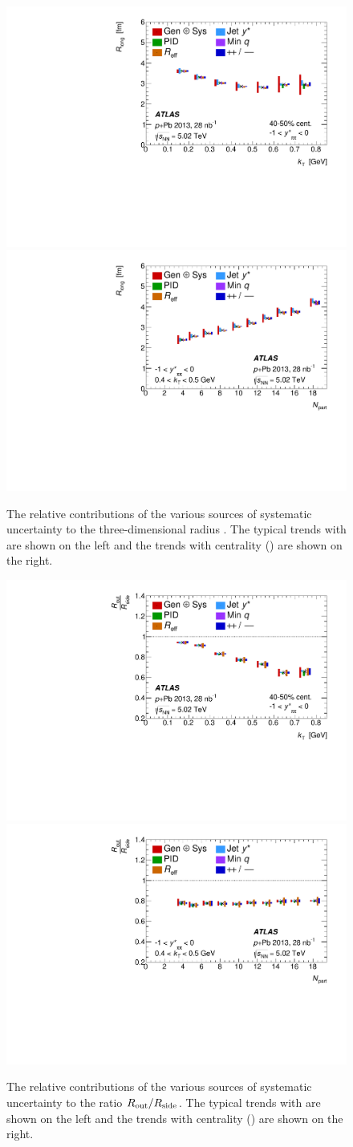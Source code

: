 \begin{figure}[t]
\centering
\includegraphics[width=0.49\linewidth]{canqosl_Rlong_vs_kt_systs.pdf}
\includegraphics[width=0.49\linewidth]{canqosl_Rlong_vs_npart_systs.pdf}\\
\caption{The relative contributions of the various sources of systematic uncertainty to the three-dimensional radius \Rlong. The typical trends with \kt are shown on the left and the trends with centrality (\Npart) are shown on the right.}
\label{fig:syst_rlong}
\end{figure}

\begin{figure}[t]
\centering
\includegraphics[width=0.49\linewidth]{canqosl_RoutOverRside_vs_kt_systs.pdf}
\includegraphics[width=0.49\linewidth]{canqosl_RoutOverRside_vs_npart_systs.pdf}\\
\caption{The relative contributions of the various sources of systematic uncertainty to the ratio $R_{\mathrm{out}} / R_{\mathrm{side}}$. The typical trends with \kt are shown on the left and the trends with centrality (\Npart) are shown on the right.}
\label{fig:syst_rout_over_rside}
\end{figure}

